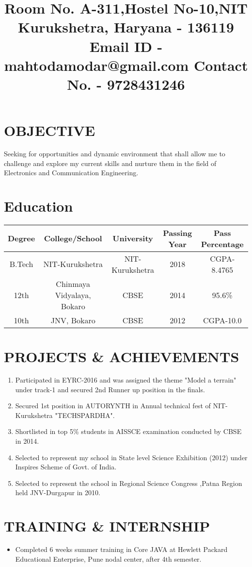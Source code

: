 \documentclass[11pt,a4paper,sans]{moderncv}
\title{   \newline Room No.  A-311,\newline Hostel No-10,\newline NIT Kurukshetra, \newline Haryana - 136119 \newline Email ID - mahtodamodar@gmail.com \newline Contact No. - 9728431246}
\begin{document}
\makecvtitle
\section{OBJECTIVE}
Seeking for opportunities and dynamic environment that shall allow me to challenge and explore my current skills and nurture them in the field of Electronics and Communication Engineering.
\section{Education}
\begin{center}
\begin{tabular}{ |c|c|c|c|c| } 
\hline
Degree & College/School & University & Passing Year & Pass Percentage \\
\hline
\multirow {1}{4em}{B.Tech} & { NIT-Kurukshetra } & { NIT-Kurukshetra } & {2018} & {CGPA-8.4765} \\ 
\hline
\multirow {1}{4em}{12th} & { Chinmaya Vidyalaya, Bokaro } & { CBSE } & {2014} & {95.6\%}\\
\hline
\multirow {1}{4em}{10th} & { JNV, Bokaro } & { CBSE } & {2012} & {CGPA-10.0}\\
\hline
\end{tabular}
\end{center}
\section{PROJECTS \& ACHIEVEMENTS}
\begin{enumerate}
\item Participated in EYRC-2016 and was assigned the theme "Model a terrain" under track-1 and secured 2nd Runner up position in the finals.
\item Secured 1st position in AUTORYNTH in Annual technical fest of NIT-Kurukshetra "TECHSPARDHA".
\item Shortlisted in top 5\% students in AISSCE examination conducted by CBSE in 2014.
\item Selected to represent my school in State level Science Exhibition (2012) under Inspires Scheme of Govt. of India.
\item Selected to represent the school in Regional Science Congress ,Patna Region held JNV-Durgapur in 2010.  
\end{enumerate}
\section{TRAINING \& INTERNSHIP}
\begin{itemize}
\item Completed 6 weeks summer training in Core JAVA at Hewlett Packard Educational Enterprise, Pune nodal center, after 4th semester.
\end{itemize}
\end{document}
